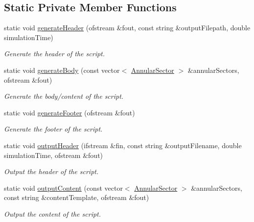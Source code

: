 \subsection*{Static Private Member Functions}
\begin{DoxyCompactItemize}
\item 
static void \hyperlink{classmultiscale_1_1video_1_1PolarGnuplotScriptGenerator_abad924831da9046dc757a7508f47ce55}{generate\-Header} (ofstream \&fout, const string \&output\-Filepath, double simulation\-Time)
\begin{DoxyCompactList}\small\item\em Generate the header of the script. \end{DoxyCompactList}\item 
static void \hyperlink{classmultiscale_1_1video_1_1PolarGnuplotScriptGenerator_a5386b0f2c6286c709c3084c5101963c6}{generate\-Body} (const vector$<$ \hyperlink{classmultiscale_1_1video_1_1AnnularSector}{Annular\-Sector} $>$ \&annular\-Sectors, ofstream \&fout)
\begin{DoxyCompactList}\small\item\em Generate the body/content of the script. \end{DoxyCompactList}\item 
static void \hyperlink{classmultiscale_1_1video_1_1PolarGnuplotScriptGenerator_af760c3b80b2d8966d7fbea00b97e3785}{generate\-Footer} (ofstream \&fout)
\begin{DoxyCompactList}\small\item\em Generate the footer of the script. \end{DoxyCompactList}\item 
static void \hyperlink{classmultiscale_1_1video_1_1PolarGnuplotScriptGenerator_a9d10aa501cb749ef09a5c3019406ddc1}{output\-Header} (ifstream \&fin, const string \&output\-Filename, double simulation\-Time, ofstream \&fout)
\begin{DoxyCompactList}\small\item\em Output the header of the script. \end{DoxyCompactList}\item 
static void \hyperlink{classmultiscale_1_1video_1_1PolarGnuplotScriptGenerator_a5ccc1caca243f48e7cb7bc1083bd07a3}{output\-Content} (const vector$<$ \hyperlink{classmultiscale_1_1video_1_1AnnularSector}{Annular\-Sector} $>$ \&annular\-Sectors, const string \&content\-Template, ofstream \&fout)
\begin{DoxyCompactList}\small\item\em Output the content of the script. \end{DoxyCompactList}\item 

\end{DoxyCompactItemize}
